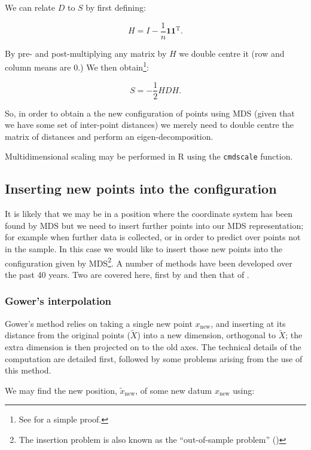\documentclass[a4paper,10pt]{amsart}
\newcommand{\tr}[1]{#1^{\text{T}}}
\begin{document}
We can relate $D$ to $S$ by first defining:

\begin{equation}
H = I-\frac{1}{n}\mathbf{1}\tr{\mathbf{1}}.
\end{equation}

By pre- and post-multiplying any matrix by $H$ we double centre it (row and column means are 0.) We then obtain\footnote{See \cite{diaconis08} for a simple proof.}:

\begin{equation}
S = -\frac{1}{2}HDH.
\end{equation}

So, in order to obtain a the new configuration of points using MDS (given that we have some set of inter-point distances) we merely need to double centre the matrix of distances and perform an eigen-decomposition.

Multidimensional scaling may be performed in \textsf{R} using the \texttt{cmdscale} function. 

\subsection{Inserting new points into the configuration}

It is likely that we may be in a position where the coordinate system has been found by MDS but we need to insert further points into our MDS representation; for example when further data is collected, or in order to predict over points not in the sample. In this case we would like to insert those new points into the configuration given by MDS\footnote{The insertion problem is also known as the ``out-of-sample problem'' (\cite{Trosset2008})}. A number of methods have been developed over the past 40 years. Two are covered here, first by \cite{gower1968} and then that of \cite{Trosset2008}.

\subsubsection{Gower's interpolation} 

Gower's method relies on taking a single new point $x_{\text{new}}$, and inserting at its distance from the original points ($\tilde{X}$) into a new dimension, orthogonal to $\tilde{X}$; the extra dimension is then projected on to the old axes. The technical details of the computation are detailed first, followed by some problems arising from the use of this method. 

We may find the new position, $\tilde{x}_{\text{new}}$, of some new datum $x_{\text{new}}$ using:
\end{document}
